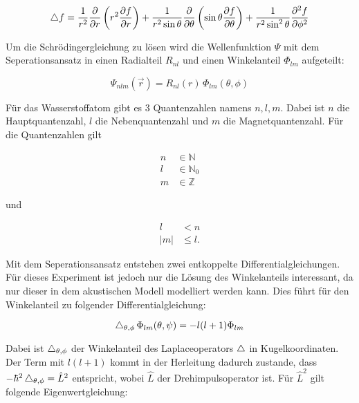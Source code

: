 \begin{equation}
    \mathop{}\!\mathbin\bigtriangleup f = \frac{1}{r^2} \frac{\partial}{\partial r} \left( r^2 \frac{\partial f}{\partial r} \right) + \frac{1}{r^2 \sin \theta} \frac{\partial}{\partial \theta} \left( \sin \theta \frac{\partial f}{\partial \theta} \right) + \frac{1}{r^2 \sin^2 \theta} \frac{\partial^2 f}{\partial \phi^2}
    \label{eqn:laplace}
\end{equation}

Um die Schrödingergleichung zu lösen wird die Wellenfunktion $\Psi$ mit dem Seperationsansatz in einen Radialteil $R_{nl}$ und einen Winkelanteil $\Phi_{lm}$ aufgeteilt:

\begin{equation}
    \Psi_{nlm} (\vec{r}) = R_{nl}(r) \, \Phi_{lm}(\theta, \phi)
    \label{eqn:seperation}
\end{equation}

Für das Wasserstoffatom gibt es 3 Quantenzahlen namens $n, l, m$. Dabei ist $n$ die Hauptquantenzahl, $l$ die Nebenquantenzahl und $m$ die Magnetquantenzahl. Für die Quantenzahlen gilt

\begin{align*}
    n &\in \mathbb{N} \\
    l &\in \mathbb{N}_0 \\
    m &\in \mathbb{Z}
\end{align*}

und

\begin{align*}
    l &< n \\
    |m| &\leq l .
\end{align*}

Mit dem Seperationsansatz entstehen zwei entkoppelte Differentialgleichungen. Für dieses Experiment ist jedoch nur die Lösung des Winkelanteils interessant, da nur dieser in dem akustischen Modell modelliert werden kann. Dies führt für den Winkelanteil zu folgender Differentialgleichung:

\begin{equation}
    \mathop{}\!\mathbin\bigtriangleup_{\theta, \phi} \, \Phi_{lm} (\theta, \psi) = - l (l+1) \Phi_{lm}
    \label{eqn:eigenwert}
\end{equation}

Dabei ist $\mathop{}\!\mathbin\bigtriangleup_{\theta, \phi}$ der Winkelanteil des Laplaceoperators $\mathop{}\!\mathbin\bigtriangleup$ in Kugelkoordinaten. Der Term mit $l (l+1)$ kommt in der Herleitung dadurch zustande, dass $- \hbar^2 \mathop{}\!\mathbin\bigtriangleup_{\theta, \phi} = \hat{L}^2$ entspricht, wobei $\hat{L}$ der Drehimpulsoperator ist. Für $\hat{L}^2$ gilt folgende Eigenwertgleichung:

